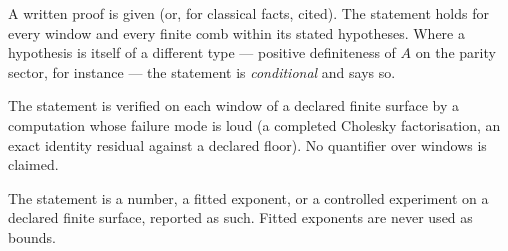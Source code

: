 \documentclass[11pt,a4paper]{article}
\theoremstyle{plain}
\theoremstyle{definition}
\begin{document}
\begin{description}[leftmargin=2.2em,style=nextline]
\item[\textnormal{\emph{proved}}] A written proof is given (or, for classical
  facts, cited). The statement holds for every window and every finite comb
  within its stated hypotheses. Where a hypothesis is itself of a different
  type --- positive definiteness of $A$ on the parity sector, for instance ---
  the statement is \emph{conditional} and says so.
\item[\textnormal{\emph{certified per window}}] The statement is verified on
  each window of a declared finite surface by a computation whose failure mode
  is loud (a completed Cholesky factorisation, an exact identity residual
  against a declared floor). No quantifier over windows is claimed.
\item[\textnormal{\emph{measured}}] The statement is a number, a fitted
  exponent, or a controlled experiment on a declared finite surface, reported as
  such. Fitted exponents are never used as bounds.
\end{description}
\end{document}
